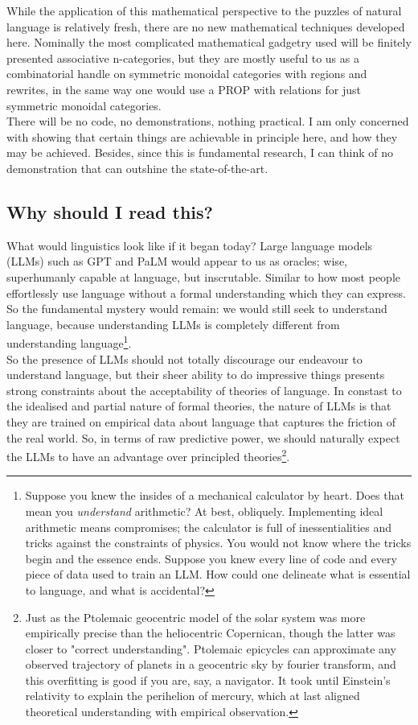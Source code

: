 While the application of this mathematical perspective to the puzzles of natural language is relatively fresh, there are no new mathematical techniques developed here. Nominally the most complicated mathematical gadgetry used will be finitely presented associative n-categories, but they are mostly useful to us as a combinatorial handle on symmetric monoidal categories with regions and rewrites, in the same way one would use a PROP with relations for just symmetric monoidal categories.\\

There will be no code, no demonstrations, nothing practical. I am only concerned with showing that certain things are achievable in principle here, and how they may be achieved. Besides, since this is fundamental research, I can think of no demonstration that can outshine the state-of-the-art.

\subsection{Why should I read this?}
What would linguistics look like if it began today?
Large language models (LLMs) such as GPT and PaLM would appear to us as oracles;
wise, superhumanly capable at language, but inscrutable.
Similar to how most people effortlessly use language without a formal understanding which they can express.
So the fundamental mystery would remain: we would still seek to understand language, because understanding LLMs is completely different from understanding language\footnote{
Suppose you knew the insides of a mechanical calculator by heart.
Does that mean you \emph{understand} arithmetic?
At best, obliquely.
Implementing ideal arithmetic means compromises;
the calculator is full of inessentialities and tricks against the constraints of physics.
You would not know where the tricks begin and the essence ends.
Suppose you knew every line of code and every piece of data used to train an LLM.
How could one delineate what is essential to language, and what is accidental?}.\\

So the presence of LLMs should not totally discourage our endeavour to understand language, but their sheer ability to do impressive things presents strong constraints about the acceptability of theories of language. In constast to the idealised and partial nature of formal theories, the nature of LLMs is that they are trained on empirical data about language that captures the friction of the real world. So, in terms of raw predictive power, we should naturally expect the LLMs to have an advantage over principled theories\footnote{Just as the Ptolemaic geocentric model of the solar system was more empirically precise than the heliocentric Copernican, though the latter was closer to "correct understanding". Ptolemaic epicycles can approximate any observed trajectory of planets in a geocentric sky by fourier transform, and this overfitting is good if you are, say, a navigator. It took until Einstein's relativity to explain the perihelion of mercury, which at last aligned theoretical understanding with empirical observation.}.\\

